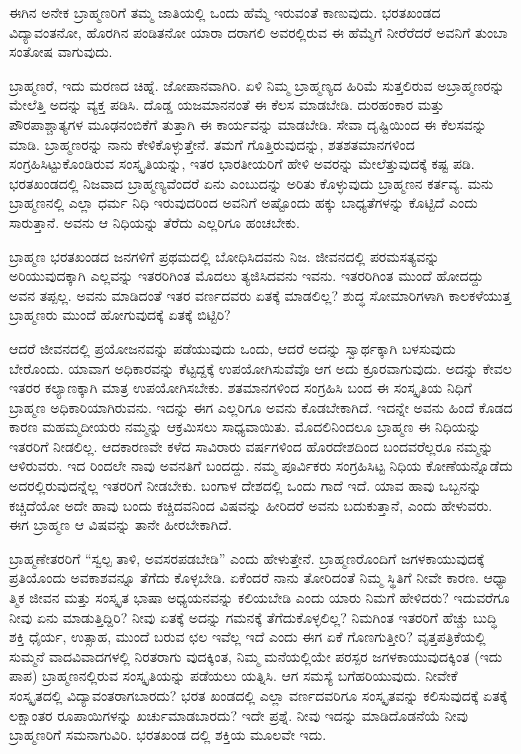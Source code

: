 ಈಗಿನ ಅನೇಕ ಬ್ರಾಹ್ಮಣರಿಗೆ ತಮ್ಮ ಜಾತಿಯಲ್ಲಿ ಒಂದು ಹೆಮ್ಮೆ ಇರುವಂತೆ ಕಾಣುವುದು. ಭರತಖಂಡದ ವಿದ್ಯಾವಂತನೋ, ಹೊರಗಿನ ಪಂಡಿತನೋ ಯಾರಾ ದರಾಗಲಿ ಅವರಲ್ಲಿರುವ ಈ ಹೆಮ್ಮೆಗೆ ನೀರೆರೆದರೆ ಅವನಿಗೆ ತುಂಬಾ ಸಂತೋಷ ವಾಗುವುದು.

ಬ್ರಾಹ್ಮಣರೆ, ಇದು ಮರಣದ ಚಿಹ್ನೆ. ಜೋಪಾನವಾಗಿರಿ. ಏಳಿ ನಿಮ್ಮ ಬ್ರಾಹ್ಮಣ್ಯದ ಹಿರಿಮೆ ಸುತ್ತಲಿರುವ ಅಬ್ರಾಹ್ಮಣರನ್ನು ಮೇಲೆತ್ತಿ ಅದನ್ನು ವ್ಯಕ್ತ ಪಡಿಸಿ. ದೊಡ್ಡ ಯಜಮಾನನಂತೆ ಈ ಕೆಲಸ ಮಾಡಬೇಡಿ. ದುರಹಂಕಾರ ಮತ್ತು ಪೌರಪಾಶ್ಚಾತ್ಯಗಳ ಮೂಢನಂಬಿಕೆಗೆ ತುತ್ತಾಗಿ ಈ ಕಾರ್ಯವನ್ನು ಮಾಡಬೇಡಿ. ಸೇವಾ ದೃಷ್ಟಿಯಿಂದ ಈ ಕೆಲಸವನ್ನು ಮಾಡಿ. ಬ್ರಾಹ್ಮಣರನ್ನು ನಾನು ಕೇಳಿಕೊಳ್ಳುತ್ತೇನೆ. ತಮಗೆ ಗೊತ್ತಿರುವುದನ್ನು, ಶತಶತಮಾನಗಳಿಂದ ಸಂಗ್ರಹಿಸಿಟ್ಟುಕೊಂಡಿರುವ ಸಂಸ್ಕೃತಿಯನ್ನು, ಇತರ ಭಾರತೀಯರಿಗೆ ಹೇಳಿ ಅವರನ್ನು ಮೇಲೆತ್ತುವುದಕ್ಕೆ ಕಷ್ಟ ಪಡಿ. ಭರತಖಂಡದಲ್ಲಿ ನಿಜವಾದ ಬ್ರಾಹ್ಮಣ್ಯವೆಂದರೆ ಏನು ಎಂಬುದನ್ನು ಅರಿತು ಕೊಳ್ಳುವುದು ಬ್ರಾಹ್ಮಣನ ಕರ್ತವ್ಯ. ಮನು ಬ್ರಾಹ್ಮಣನಲ್ಲಿ ಎಲ್ಲಾ ಧರ್ಮ ನಿಧಿ ಇರುವುದರಿಂದ ಅವನಿಗೆ ಅಷ್ಟೊಂದು ಹಕ್ಕು ಬಾಧ್ಯತೆಗಳನ್ನು ಕೊಟ್ಟಿದೆ ಎಂದು ಸಾರುತ್ತಾನೆ. ಅವನು ಆ ನಿಧಿಯನ್ನು ತೆರೆದು ಎಲ್ಲರಿಗೂ ಹಂಚಬೇಕು.

ಬ್ರಾಹ್ಮಣ ಭರತಖಂಡದ ಜನಗಳಿಗೆ ಪ್ರಥಮದಲ್ಲಿ ಬೋಧಿಸಿದವನು ನಿಜ. ಜೀವನದಲ್ಲಿ ಪರಮಸತ್ಯವನ್ನು ಅರಿಯುವುದಕ್ಕಾಗಿ ಎಲ್ಲವನ್ನು ಇತರರಿಗಿಂತ ಮೊದಲು ತ್ಯಜಿಸಿದವನು ಇವನು. ಇತರರಿಗಿಂತ ಮುಂದೆ ಹೋದದ್ದು ಅವನ ತಪ್ಪಲ್ಲ. ಅವನು ಮಾಡಿದಂತೆ ಇತರ ವರ್ಣದವರು ಏತಕ್ಕೆ ಮಾಡಲಿಲ್ಲ? ಶುದ್ಧ ಸೋಮಾರಿಗಳಾಗಿ ಕಾಲಕಳೆಯುತ್ತ ಬ್ರಾಹ್ಮಣರು ಮುಂದೆ ಹೋಗುವುದಕ್ಕೆ ಏತಕ್ಕೆ ಬಿಟ್ಟಿರಿ?

ಆದರೆ ಜೀವನದಲ್ಲಿ ಪ್ರಯೋಜನವನ್ನು ಪಡೆಯುವುದು ಒಂದು, ಆದರೆ ಅದನ್ನು ಸ್ವಾರ್ಥಕ್ಕಾಗಿ ಬಳಸುವುದು ಬೇರೊಂದು. ಯಾವಾಗ ಅಧಿಕಾರವನ್ನು ಕೆಟ್ಟದ್ದಕ್ಕೆ ಉಪಯೋಗಿಸುವೆವೊ ಆಗ ಅದು ಕ್ರೂರವಾಗುವುದು. ಅದನ್ನು ಕೇವಲ ಇತರರ ಕಲ್ಯಾಣಕ್ಕಾಗಿ ಮಾತ್ರ ಉಪಯೋಗಿಸಬೇಕು. ಶತಮಾನಗಳಿಂದ ಸಂಗ್ರಹಿಸಿ ಬಂದ ಈ ಸಂಸ್ಕೃತಿಯ ನಿಧಿಗೆ ಬ್ರಾಹ್ಮಣ ಅಧಿಕಾರಿಯಾಗಿರುವನು. ಇದನ್ನು ಈಗ ಎಲ್ಲರಿಗೂ ಅವನು ಕೊಡಬೇಕಾಗಿದೆ. ಇದನ್ನೇ ಅವನು ಹಿಂದೆ ಕೊಡದ ಕಾರಣ ಮಹಮ್ಮದೀಯರು ನಮ್ಮನ್ನು ಆಕ್ರಮಿಸಲು ಸಾಧ್ಯವಾಯಿತು. ಮೊದಲಿನಿಂದಲೂ ಬ್ರಾಹ್ಮಣ ಈ ನಿಧಿಯನ್ನು ಇತರರಿಗೆ ನೀಡಲಿಲ್ಲ. ಆದಕಾರಣವೇ ಕಳೆದ ಸಾವಿರಾರು ವರ್ಷಗಳಿಂದ ಹೊರದೇಶದಿಂದ ಬಂದವರೆಲ್ಲರೂ ನಮ್ಮನ್ನು ಆಳಿರುವರು. ಇದ ರಿಂದಲೇ ನಾವು ಅವನತಿಗೆ ಬಂದದ್ದು. ನಮ್ಮ ಪೂರ್ವಿಕರು ಸಂಗ್ರಹಿಸಿಟ್ಟ ನಿಧಿಯ ಕೋಣೆಯನ್ನೊಡೆದು ಅದರಲ್ಲಿರುವುದನ್ನೆಲ್ಲ ಇತರರಿಗೆ ನೀಡಬೇಕು. ಬಂಗಾಳ ದೇಶದಲ್ಲಿ ಒಂದು ಗಾದೆ ಇದೆ. ಯಾವ ಹಾವು ಒಬ್ಬನನ್ನು ಕಚ್ಚಿದೆಯೋ ಅದೇ ಹಾವು ಬಂದು ಕಚ್ಚಿದವನಿಂದ ವಿಷವನ್ನು ಹೀರಿದರೆ ಅವನು ಬದುಕುತ್ತಾನೆ, ಎಂದು ಹೇಳುವರು. ಈಗ ಬ್ರಾಹ್ಮಣ ಆ ವಿಷವನ್ನು ತಾನೇ ಹೀರಬೇಕಾಗಿದೆ.

ಬ್ರಾಹ್ಮಣೇತರರಿಗೆ “ಸ್ವಲ್ಪ ತಾಳಿ, ಅವಸರಪಡಬೇಡಿ” ಎಂದು ಹೇಳುತ್ತೇನೆ. ಬ್ರಾಹ್ಮಣರೊಂದಿಗೆ ಜಗಳಕಾಯುವುದಕ್ಕೆ ಪ್ರತಿಯೊಂದು ಅವಕಾಶವನ್ನೂ ತೆಗೆದು ಕೊಳ್ಳಬೇಡಿ. ಏಕೆಂದರೆ ನಾನು ತೋರಿದಂತೆ ನಿಮ್ಮ ಸ್ಥಿತಿಗೆ ನೀವೇ ಕಾರಣ. ಆಧ್ಯಾ ತ್ಮಿಕ ಜೀವನ ಮತ್ತು ಸಂಸ್ಕೃತ ಭಾಷಾ ಅಧ್ಯಯನವನ್ನು ಕಲಿಯಬೇಡಿ ಎಂದು ಯಾರು ನಿಮಗೆ ಹೇಳಿದರು? ಇದುವರೆಗೂ ನೀವು ಏನು ಮಾಡುತ್ತಿದ್ದಿರಿ? ನೀವು ಏತಕ್ಕೆ ಅದನ್ನು ಗಮನಕ್ಕೆ ತೆಗೆದುಕೊಳ್ಳಲಿಲ್ಲ? ನಿಮಗಿಂತ ಇತರರಿಗೆ ಹೆಚ್ಚು ಬುದ್ಧಿ ಶಕ್ತಿ ಧೈರ್ಯ, ಉತ್ಸಾಹ, ಮುಂದೆ ಬರುವ ಛಲ ಇವೆಲ್ಲ ಇದೆ ಎಂದು ಈಗ ಏಕೆ ಗೊಣಗುತ್ತೀರಿ? ವೃತ್ತಪತ್ರಿಕೆಯಲ್ಲಿ ಸುಮ್ಮನೆ ವಾದವಿವಾದಗಳಲ್ಲಿ ನಿರತರಾಗು ವುದಕ್ಕಿಂತ, ನಿಮ್ಮ ಮನೆಯಲ್ಲಿಯೇ ಪರಸ್ಪರ ಜಗಳಕಾಯುವುದಕ್ಕಿಂತ (ಇದು ಪಾಪ) ಬ್ರಾಹ್ಮಣನಲ್ಲಿರುವ ಸಂಸ್ಕೃತಿಯನ್ನು ಪಡೆಯಲು ಯತ್ನಿಸಿ. ಆಗ ಸಮಸ್ಯೆ ಬಗೆಹರಿಯುವುದು. ನೀವೇಕೆ ಸಂಸ್ಕೃತದಲ್ಲಿ ವಿದ್ಯಾವಂತರಾಗಬಾರದು? ಭರತ ಖಂಡದಲ್ಲಿ ಎಲ್ಲಾ ವರ್ಣದವರಿಗೂ ಸಂಸ್ಕೃತವನ್ನು ಕಲಿಸುವುದಕ್ಕೆ ಏತಕ್ಕೆ ಲಕ್ಷಾಂತರ ರೂಪಾಯಿಗಳನ್ನು ಖರ್ಚುಮಾಡಬಾರದು? ಇದೇ ಪ್ರಶ್ನೆ. ನೀವು ಇದನ್ನು ಮಾಡಿದೊಡನೆಯೆ ನೀವು ಬ್ರಾಹ್ಮಣರಿಗೆ ಸಮನಾಗುವಿರಿ. ಭರತಖಂಡ ದಲ್ಲಿ ಶಕ್ತಿಯ ಮೂಲವೇ ಇದು.


